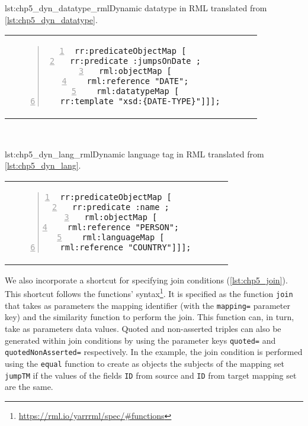 \begin{minipage}{0.45\linewidth}
\begin{captionedlisting}{lst:chp5_dyn_datatype_rml}{Dynamic datatype in RML translated from \cref{lst:chp5_dyn_datatype}.}
\centering
\begin{tabular}{c}
\hspace{-1em}
{
\begin{lstlisting}[numbers=left,basicstyle=\ttfamily\small,columns=flexible]
rr:predicateObjectMap [ 
 rr:predicate :jumpsOnDate ;
 rml:objectMap [
  rml:reference "DATE";
  rml:datatypeMap [
   rr:template "xsd:{DATE-TYPE}"]]];
\end{lstlisting}
}
\end{tabular}
\end{captionedlisting}
\end{minipage}
\,\,\,\,\hfill
\begin{minipage}{0.45\linewidth}
\begin{captionedlisting}{lst:chp5_dyn_lang_rml}{Dynamic language tag in RML translated from \cref{lst:chp5_dyn_lang}.}
\centering
\begin{tabular}{c}
\hspace{0.5em}
{
\begin{lstlisting}[numbers=left,basicstyle=\ttfamily\small,columns=flexible]
rr:predicateObjectMap [ 
 rr:predicate :name ;
 rml:objectMap [
  rml:reference "PERSON";
  rml:languageMap [
   rml:reference "COUNTRY"]]];
\end{lstlisting}
}
\end{tabular}
\end{captionedlisting}
\end{minipage}


We also incorporate a shortcut for specifying join conditions (\cref{lst:chp5_join}). This shortcut follows the functions' syntax\footnote{\url{https://rml.io/yarrrml/spec/\#functions}}. %
It is specified as the function \texttt{join} that takes as parameters the mapping identifier (with the \texttt{mapping=} parameter key) and the similarity function to perform the join. 
This function can, in turn, take as parameters data values. 
Quoted and non-asserted triples can also be generated within join conditions by using the parameter keys \texttt{quoted=} and \texttt{quotedNonAsserted=} respectively.
In the example, the join condition is performed using the \texttt{equal} function to create as objects the subjects of the mapping set \texttt{jumpTM} if the values of the fields \texttt{ID} from source and \texttt{ID} from target mapping set are the same.

